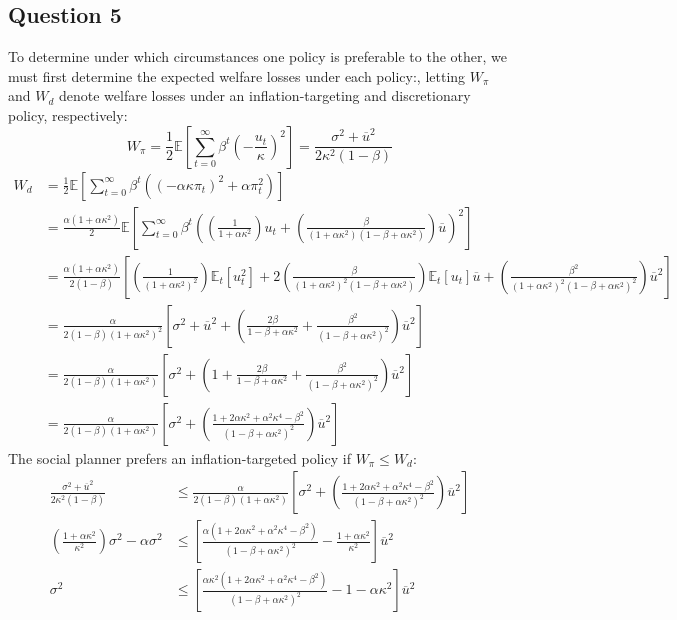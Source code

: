 \documentclass{article}
\newcommand{\E}[1]{\mathbb{E}\left[#1\right]} %
\newcommand{\Et}[1]{\mathbb{E}_t\left[#1\right]}
\begin{document}

\subsection*{Question 5}
To determine under which circumstances one policy is preferable to the other, we must first determine the expected welfare losses under each policy:, letting $W_\pi$ and $W_d$ denote welfare losses under an inflation-targeting and discretionary policy, respectively:
\[
	W_\pi 	= \frac{1}{2}\E{\sum_{t=0}^\infty\beta^t\left(-\frac{u_t}{\kappa}\right)^2}
			= \frac{\sigma^2+\overline{u}^2}{2\kappa^2(1-\beta)}
\]
{\footnotesize \begin{align*}
	W_d		&= \frac{1}{2}\E{\sum_{t=0}^\infty\beta^t\left((-\alpha\kappa\pi_t)^2 + \alpha\pi_t^2\right)}	\\
			&= \frac{\alpha(1+\alpha\kappa^2)}{2}\E{\sum_{t=0}^\infty\beta^t
					\left(\left(\frac{1}{1 + \alpha\kappa^2}\right)u_t + \left(\frac{\beta}{(1 + \alpha\kappa^2)(1 -\beta + \alpha\kappa^2)}\right)\overline{u}\right)^2
				}		\\
			&= \frac{\alpha(1+\alpha\kappa^2)}{2(1-\beta)}\left[
					\left(\frac{1}{(1 + \alpha\kappa^2)^2}\right)\Et{u_t^2} + 
					2\left(\frac{\beta}{(1 + \alpha\kappa^2)^2(1 -\beta + \alpha\kappa^2)}\right)\Et{u_t}\overline{u} +
					\left(\frac{\beta^2}{(1 + \alpha\kappa^2)^2(1 -\beta + \alpha\kappa^2)^2}\right)\overline{u}^2
				\right]		\\
			&= \frac{\alpha}{2(1-\beta)(1 + \alpha\kappa^2)^2}\left[
					\sigma^2+\overline{u}^2 + 
					\left(\frac{2\beta}{1 -\beta + \alpha\kappa^2} + \frac{\beta^2}{(1 -\beta + \alpha\kappa^2)^2}\right)\overline{u}^2
				\right]		\\
			&= \frac{\alpha}{2(1-\beta)(1+\alpha\kappa^2)}\left[
					\sigma^2 + \left(
							1 + \frac{2\beta}{1 -\beta + \alpha\kappa^2} 
							+ \frac{\beta^2}{(1 -\beta + \alpha\kappa^2)^2}
							\right)\overline{u}^2
				\right]		\\
			&= \frac{\alpha}{2(1-\beta)(1+\alpha\kappa^2)}\left[
					\sigma^2 + \left(
							\frac{1+2\alpha\kappa^2 + \alpha^2\kappa^4-\beta^2}{(1 -\beta + \alpha\kappa^2)^2}
							\right)\overline{u}^2
				\right]	
\end{align*} }
The social planner prefers an inflation-targeted policy if $W_\pi\leq W_d$:
\begin{align*}
	\frac{\sigma^2+\overline{u}^2}{2\kappa^2(1-\beta)}	&\leq 
		\frac{\alpha}{2(1-\beta)(1+\alpha\kappa^2)}\left[
					\sigma^2 + \left(
							\frac{1+2\alpha\kappa^2 + \alpha^2\kappa^4-\beta^2}{(1 -\beta + \alpha\kappa^2)^2}
							\right)\overline{u}^2 \right]	\\
	\left(\frac{1+\alpha\kappa^2}{\kappa^2}\right)\sigma^2-\alpha\sigma^2 &\leq	
		\left[\frac{\alpha(1+2\alpha\kappa^2 + \alpha^2\kappa^4-\beta^2)}{(1 -\beta + \alpha\kappa^2)^2} - \frac{1+\alpha\kappa^2}{\kappa^2}\right]\overline{u}^2	\\
	\sigma^2 &\leq \left[\frac{\alpha\kappa^2(1+2\alpha\kappa^2 + \alpha^2\kappa^4-\beta^2)}{(1 -\beta + \alpha\kappa^2)^2} - 1-\alpha\kappa^2\right]\overline{u}^2
\end{align*}
\end{document}
